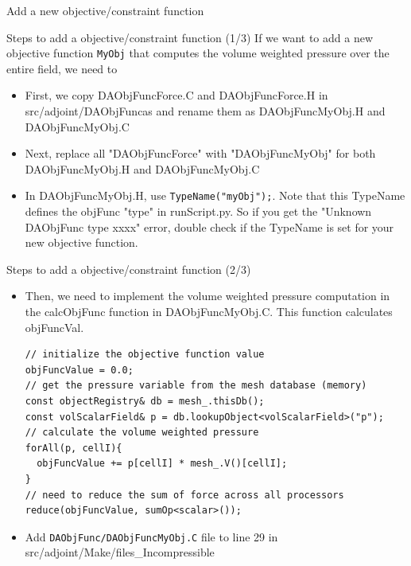 \documentclass{bredelebeamer}
\begin{document}
\begin{frame}{}
  \center \Large Add a new objective/constraint function
\end{frame}

\begin{frame}[fragile]{Steps to add a objective/constraint function (1/3)}
If we want to add a new objective function \texttt{MyObj} that computes the volume weighted pressure over the entire field, we need to
\begin{itemize}
  \setlength\itemsep{0.5em}
 \item First, we copy DAObjFuncForce.C and DAObjFuncForce.H in src/adjoint/DAObjFuncas and rename them as DAObjFuncMyObj.H and DAObjFuncMyObj.C
 \item Next, replace all "DAObjFuncForce" with "DAObjFuncMyObj" for both DAObjFuncMyObj.H and DAObjFuncMyObj.C
 \item In DAObjFuncMyObj.H, use \texttt{TypeName("myObj");}. Note that this TypeName defines the objFunc "type" in runScript.py. So if you get the "Unknown DAObjFunc type xxxx" error, double check if the TypeName is set for your new objective function.
\end{itemize}
\end{frame}

\begin{frame}[fragile]{Steps to add a objective/constraint function (2/3)}
\begin{itemize}
  \setlength\itemsep{0.5em}
 \item Then, we need to implement the volume weighted pressure computation in the calcObjFunc function in DAObjFuncMyObj.C. This function calculates objFuncVal.
 \footnotesize
 \lstset{ language=c++ }
 \begin{lstlisting}
// initialize the objective function value
objFuncValue = 0.0;
// get the pressure variable from the mesh database (memory)
const objectRegistry& db = mesh_.thisDb();
const volScalarField& p = db.lookupObject<volScalarField>("p");
// calculate the volume weighted pressure
forAll(p, cellI){
  objFuncValue += p[cellI] * mesh_.V()[cellI];
}
// need to reduce the sum of force across all processors
reduce(objFuncValue, sumOp<scalar>());
 \end{lstlisting}
 \normalsize
 \item Add \texttt{DAObjFunc/DAObjFuncMyObj.C} file to line 29 in src/adjoint/Make/files\_Incompressible
\end{itemize}
\end{frame}
\end{document}
